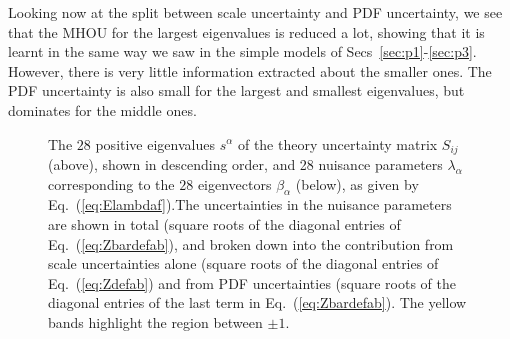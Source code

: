 Looking now at the split between scale uncertainty and PDF uncertainty, we see that the MHOU for the largest eigenvalues is reduced a lot, showing that it is learnt in the same way we saw in the simple models of Secs~\ref{sec:p1}-\ref{sec:p3}. However, there is very little information extracted about the smaller ones. The PDF uncertainty is also small for the largest and smallest eigenvalues, but dominates for the middle ones. 
  \begin{figure}[H]
    \begin{center}
    \end{center}
  \vspace{-0.55cm}
  \caption{The $28$ positive eigenvalues $s^\alpha$ of the theory uncertainty matrix $S_{ij}$ (above), shown in descending order, and 28 nuisance parameters $\lambda_\alpha$ corresponding to the $28$ eigenvectors $\beta_\alpha$ (below), as given by Eq.~(\ref{eq:Elambdaf}).The uncertainties in the nuisance parameters are shown in total (square roots of the diagonal entries of Eq.~(\ref{eq:Zbardefab}), and broken down into the contribution from scale uncertainties alone (square roots of the diagonal entries of Eq.~(\ref{eq:Zdefab})  and from PDF uncertainties (square roots of the diagonal entries of the last term in Eq.~(\ref{eq:Zbardefab}). The yellow bands highlight the region between $\pm 1$.}
  \label{fig:nuisancediag}
    \begin{center}

\end{center}
\end{figure}
